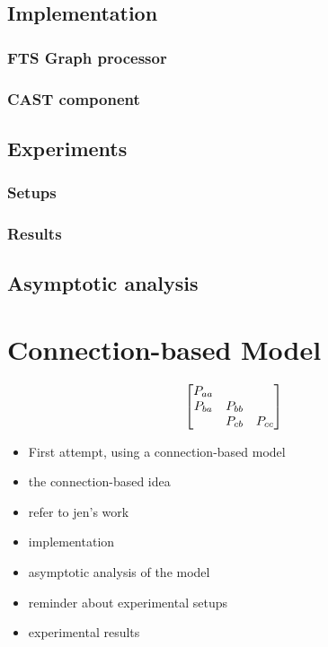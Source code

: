 \documentclass[11pt, a4paper]{report}
\begin{document}
\section{Implementation}
\subsection{FTS Graph processor}
\subsection{CAST component}
\section{Experiments}
\subsection{Setups}
\subsection{Results}
\section{Asymptotic analysis}

\chapter{Connection-based Model}
\label{cha:conn-based-model}

\[
\begin{bmatrix}
  P_{aa} & \empty & \empty\\
  P_{ba} & P_{bb} & \empty\\
  \empty & P_{cb} & P_{cc}
\end{bmatrix}
\]

\begin{itemize}
\item First attempt, using a connection-based model
\item the connection-based idea
\item refer to jen's work
\item implementation
\item asymptotic analysis of the model
\item reminder about experimental setups
\item experimental results
\end{itemize}
\end{document}
